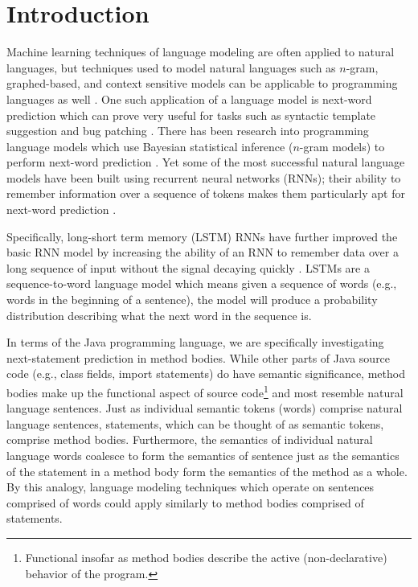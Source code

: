 \documentclass[runningheads,a4paper]{llncs}
\begin{document}
\section{Introduction}
\label{submission}

Machine learning techniques of language modeling are often applied
to natural languages, but techniques used to model natural languages
such as $n$-gram, graphed-based, and context sensitive models
can be applicable to programming languages as well
\cite{Allamanis} \cite{Nguyen} \cite{Asaduzzaman}.
One such application of a language model is next-word prediction
which can prove very useful for tasks such as syntactic template
suggestion and bug patching
\cite{Nguyen} \cite{Kim}.
There has been research into programming language models
which use Bayesian statistical inference ($n$-gram models)
to perform next-word prediction \cite{Allamanis}.
Yet some of the most successful natural language models have been
built using recurrent neural networks (RNNs); their ability to
remember information over a sequence of tokens makes them particularly apt for
next-word prediction \cite{Zaremba}.

Specifically, long-short term memory (LSTM) RNNs have further improved
the basic RNN model by increasing the ability of an RNN to remember
data over a long sequence of input without the signal decaying
quickly \cite{Zaremba}. LSTMs are a sequence-to-word language
model which means given a sequence of words (e.g., words in the
beginning of a sentence), the model will produce a probability
distribution describing what the next word in the sequence is.

In terms of the Java programming language,
we are specifically investigating next-statement prediction in method
bodies. While other parts of Java source code (e.g., class fields,
import statements) do have semantic significance, method bodies make up
the functional aspect of source code\footnote{
Functional insofar as method bodies describe the active (non-declarative)
behavior of the program.} and most resemble natural language sentences.
Just as individual semantic tokens (words) comprise natural language
sentences, statements, which can be thought of as semantic tokens,
comprise method bodies. Furthermore, the semantics of individual natural
language words coalesce to form the semantics of sentence just as the
semantics of the statement in a method body form the semantics of the
method as a whole. By this analogy, language modeling techniques which
operate on sentences comprised of words could apply similarly to method
bodies comprised of statements.
\end{document}

